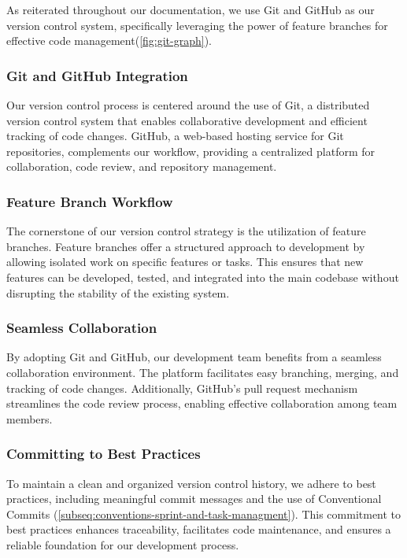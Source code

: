 \documentclass[12pt,a4paper]{article}
\begin{document}
\begin{spacing}{1.5}
    As reiterated throughout our documentation, we use Git and GitHub as our
    version control system, specifically leveraging the power of feature branches
    for effective code management(\autoref{fig:git-graph}).

    \subsubsection{Git and GitHub Integration}
    Our version control process is centered around the use of Git, a distributed
    version control system that enables collaborative development and efficient
    tracking of code changes. GitHub, a web-based hosting service for Git
    repositories, complements our workflow, providing a centralized platform for
    collaboration, code review, and repository management.

    \subsubsection{Feature Branch Workflow}
    The cornerstone of our version control strategy is the utilization of feature
    branches. Feature branches offer a structured approach to development by
    allowing isolated work on specific features or tasks. This ensures that new
    features can be developed, tested, and integrated into the main codebase
    without disrupting the stability of the existing system.

    \subsubsection{Seamless Collaboration}
    By adopting Git and GitHub, our development team benefits from a seamless
    collaboration environment. The platform facilitates easy branching, merging,
    and tracking of code changes. Additionally, GitHub's pull request mechanism
    streamlines the code review process, enabling effective collaboration among
    team members.

    \subsubsection{Committing to Best Practices}
    To maintain a clean and organized version control history, we adhere to best
    practices, including meaningful commit messages and the use of Conventional
    Commits (\autoref{subseq:conventions-sprint-and-task-managment}). This
    commitment to best practices enhances traceability, facilitates code
    maintenance, and ensures a reliable foundation for our development process.


\end{spacing}
\end{document}
